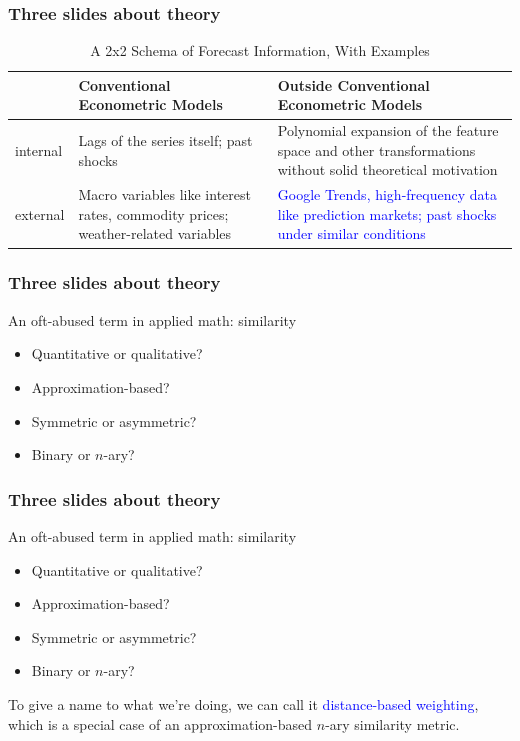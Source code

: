 \documentclass[9pt]{beamer}
\theoremstyle{definition}
\begin{document}
\begin{frame}\frametitle{Three slides about theory}
   
    \begin{table}[htb]
        \centering %
        \caption{A 2x2 Schema of Forecast Information, With Examples}
        \begin{tabular}{ | p{1cm} | p{4.8cm}| p{4.8cm} | } 
          \hline
          & Conventional Econometric Models & Outside Conventional Econometric Models\\ 
          \hline
          internal & Lags of the series itself; past shocks & Polynomial expansion of the feature space and other transformations without solid theoretical motivation \\
          \hline
          external & Macro variables like interest rates, commodity prices; weather-related variables & \textcolor{blue}{Google Trends, high-frequency data like prediction markets; past shocks under similar conditions} \\ 
          \hline
        \end{tabular}
      \end{table}
\end{frame}

\begin{frame}\frametitle{Three slides about theory}
   
    An oft-abused term in applied math: similarity
    \begin{itemize}
    \item Quantitative or qualitative?
    \item Approximation-based?
    \item Symmetric or asymmetric?
    \item Binary or $n$-ary?
    \end{itemize}

\end{frame}

\begin{frame}\frametitle{Three slides about theory}
   
    An oft-abused term in applied math: similarity
    \begin{itemize}
    \item Quantitative or qualitative?
    \item Approximation-based?
    \item Symmetric or asymmetric?
    \item Binary or $n$-ary?
    \end{itemize}

    To give a name to what we're doing, we can call it \textcolor{blue}{distance-based weighting}, which is a special case of an approximation-based $n$-ary similarity metric.
\end{frame}
\end{document}
